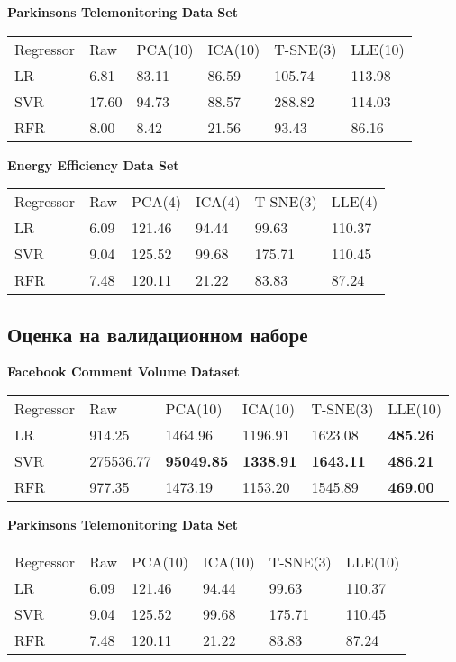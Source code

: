 \documentclass[runningheads]{llncs}
\begin{document}
\textbf{Parkinsons Telemonitoring Data Set}
\begin{table}[H]
\begin{tabular}{llllll}
Regressor                 & Raw   & PCA(10) & ICA(10) & T-SNE(3) & LLE(10) \\
LR         & 6.81  & 83.11   & 86.59   & 105.74   & 113.98  \\
SVR & 17.60 & 94.73   & 88.57   & 288.82   & 114.03  \\
RFR   & 8.00  & 8.42    & 21.56   & 93.43    & 86.16  
\end{tabular}
\end{table}

\textbf{Energy Efficiency Data Set}
\begin{table}[H]
\begin{tabular}{llllll}
Regressor                 & Raw  & PCA(4) & ICA(4) & T-SNE(3) & LLE(4) \\
LR         & 6.09 & 121.46  & 94.44   & 99.63    & 110.37  \\
SVR & 9.04 & 125.52  & 99.68   & 175.71   & 110.45  \\
RFR   & 7.48 & 120.11  & 21.22   & 83.83    & 87.24  
\end{tabular}
\end{table}

\subsection{Оценка на валидационном наборе}
\textbf{Facebook Comment Volume Dataset}

\begin{table}[H]
\begin{tabular}{llllll}
Regressor & Raw     & PCA(10)   & ICA(10) & T-SNE(3) & LLE(10) \\
LR    & 914.25  & 1464.96    & 1196.91  & 1623.08  & \textbf{485.26} \\
SVR   & 275536.77 & \textbf{95049.85} & \textbf{1338.91} & \textbf{1643.11}  & \textbf{486.21} \\
RFR   & 977.35  & 1473.19    & 1153.20  & 1545.89  & \textbf{469.00}
\end{tabular}
\end{table}

\textbf{Parkinsons Telemonitoring Data Set}
\begin{table}[H]
\begin{tabular}{llllll}
Regressor                 & Raw   & PCA(10) & ICA(10) & T-SNE(3) & LLE(10) \\
LR         &  6.09  & 121.46  & 94.44   & 99.63 & 110.37  \\
SVR & 9.04 & 125.52   & 99.68   & 175.71   & 110.45  \\
RFR   & 7.48  & 120.11  & 21.22   & 83.83  & 87.24  
\end{tabular}
\end{table}
\end{document}
